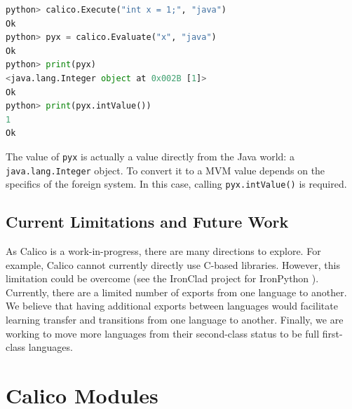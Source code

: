 \documentclass[preprint]{sigplanconf}
\begin{document}
\begin{lstlisting}[language=Python, caption={Calling Java from Python.}, label={callingjava1}]
python> calico.Execute("int x = 1;", "java")
Ok
python> pyx = calico.Evaluate("x", "java")
Ok
python> print(pyx) 
<java.lang.Integer object at 0x002B [1]>
Ok
python> print(pyx.intValue())
1
Ok
\end{lstlisting}

The value of \texttt{pyx} is actually a value directly from the Java
world: a \texttt{java.lang.Integer} object. To convert it to a MVM value
depends on the specifics of the foreign system. In this case,
calling \texttt{pyx.intValue()} is required.

\subsection{Current Limitations and Future Work}

As Calico is a work-in-progress, there are many directions to
explore. For example, Calico cannot currently directly use C-based
libraries.  However, this limitation could be overcome (see the
IronClad project for IronPython \cite{ironclad}). Currently, there are
a limited number of exports from one language to another. We believe
that having additional exports between languages would facilitate
learning transfer and transitions from one language to another.
Finally, we are working to move more languages from their second-class
status to be full first-class languages.


\section{Calico Modules}
\end{document}
